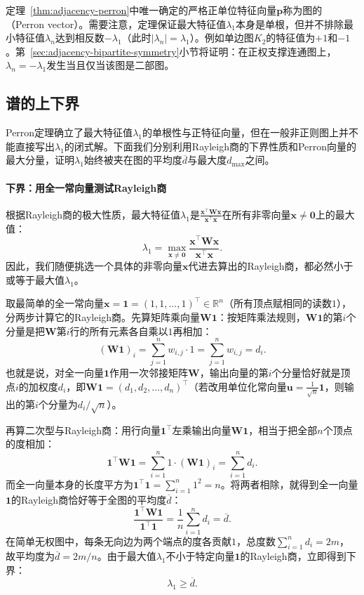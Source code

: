 定理~\ref{thm:adjacency-perron}中唯一确定的严格正单位特征向量$\bm p$称为图的（Perron vector）。需要注意，定理保证最大特征值$\lambda_1$本身是单根，但并不排除最小特征值$\lambda_n$达到相反数$-\lambda_1$（此时$|\lambda_n|=\lambda_1$）。例如单边图$K_2$的特征值为$+1$和$-1$。第~\ref{sec:adjacency-bipartite-symmetry}小节将证明：在正权支撑连通图上，$\lambda_n=-\lambda_1$发生当且仅当该图是二部图。

\subsection{谱的上下界}
\label{sec:adjacency-degree-bounds}

Perron定理确立了最大特征值$\lambda_1$的单根性与正特征向量，但在一般非正则图上并不能直接写出$\lambda_1$的闭式解。下面我们分别利用Rayleigh商的下界性质和Perron向量的最大分量，证明$\lambda_1$始终被夹在图的平均度$\overline d$与最大度$d_{\max}$之间。

\paragraph{下界：用全一常向量测试Rayleigh商}

根据Rayleigh商的极大性质，最大特征值$\lambda_1$是$\frac{\bm x^\top\bm W\bm x}{\bm x^\top\bm x}$在所有非零向量$\bm x\neq\bm 0$上的最大值：
\[
\lambda_1=\max_{\bm x\neq\bm 0}\frac{\bm x^\top\bm W\bm x}{\bm x^\top\bm x}.
\]
因此，我们随便挑选一个具体的非零向量$\bm x$代进去算出的Rayleigh商，都必然小于或等于最大值$\lambda_1$。

取最简单的全一常向量$\bm x=\bm 1=(1,1,\ldots,1)^\top\in\mathbb R^n$（所有顶点赋相同的读数$1$），分两步计算它的Rayleigh商。先算矩阵乘向量$\bm W\bm 1$：按矩阵乘法规则，$\bm W\bm 1$的第$i$个分量是把$\bm W$第$i$行的所有元素各自乘以$1$再相加：
\[
(\bm W\bm 1)_i=\sum_{j=1}^n w_{i,j}\cdot 1=\sum_{j=1}^n w_{i,j}=d_i.
\]
也就是说，对全一向量$\bm 1$作用一次邻接矩阵$\bm W$，输出向量的第$i$个分量恰好就是顶点$i$的加权度$d_i$，即$\bm W\bm 1=(d_1,d_2,\ldots,d_n)^\top$（若改用单位化常向量$\bm u=\frac{1}{\sqrt n}\bm 1$，则输出的第$i$个分量为$d_i/\sqrt n$）。

再算二次型与Rayleigh商：用行向量$\bm 1^\top$左乘输出向量$\bm W\bm 1$，相当于把全部$n$个顶点的度相加：
\[
\bm 1^\top\bm W\bm 1=\sum_{i=1}^n 1\cdot(\bm W\bm 1)_i=\sum_{i=1}^n d_i.
\]
而全一向量本身的长度平方为$\bm 1^\top\bm 1=\sum_{i=1}^n 1^2=n$。将两者相除，就得到全一向量$\bm 1$的Rayleigh商恰好等于全图的平均度$\overline d$：
\[
\frac{\bm 1^\top\bm W\bm 1}{\bm 1^\top\bm 1}
=\frac{1}{n}\sum_{i=1}^n d_i
=\overline d.
\]
在简单无权图中，每条无向边为两个端点的度各贡献$1$，总度数$\sum_{i=1}^n d_i=2m$，故平均度为$\overline d=2m/n$。由于最大值$\lambda_1$不小于特定向量$\bm 1$的Rayleigh商，立即得到下界：
\[
\lambda_1\geq\overline d.
\]

